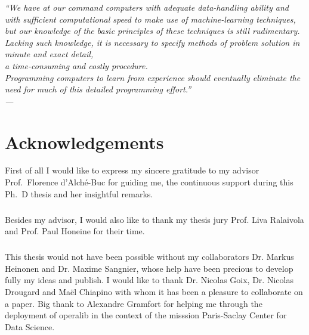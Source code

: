 

\begin{flushright}{\slshape
    ``We have at our command computers with adequate data-handling ability and
    with sufficient computational speed to make use of machine-learning
    techniques, \\
    but our knowledge of the basic principles of these techniques is still
    rudimentary. \\
    Lacking such knowledge, it is necessary to specify methods of
    problem solution in minute and exact detail, \\
    a time-consuming and costly procedure. \\
    Programming computers to learn from experience should eventually
    eliminate the need for much of this detailed programming effort.'' \\
    --- 
    \citep{samuel1959some}}
\end{flushright}

\bigskip


\begingroup

\let\clearpage\relax
\let\cleardoublepage\relax
\let\cleardoublepage\relax

\chapter*{Acknowledgements}

First of all I would like to express my sincere gratitude to my advisor
Prof.~Florence d'Alch\'e-Buc for guiding me, the continuous support during this
Ph.~D thesis and her insightful remarks.
\paragraph{}
Besides my advisor, I would also like to thank my thesis jury Prof. Liva
Ralaivola and Prof. Paul Honeine for their time.
\paragraph{}
This thesis would not have been possible without my collaborators Dr. Markus
Heinonen and Dr. Maxime Sangnier, whose help have been precious to develop
fully my ideas and publish. I would like to thank Dr. Nicolas Goix, Dr. Nicolas
Drougard and Ma\"el Chiapino with whom it has been a pleasure to collaborate on
a paper. Big thank to Alexandre Gramfort for helping me through the deployment
of operalib in the context of the misssion Paris-Saclay Center for Data
Science.
